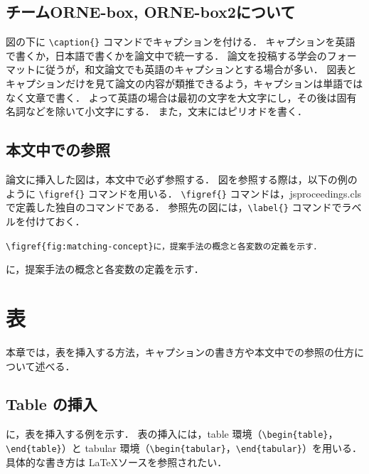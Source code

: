 \documentclass[uplatex, twocolumn, 9pt]{jsproceedings}
\begin{document}
\subsection{チームORNE-box, ORNE-box2について}
図の下に \verb*|\caption{}| コマンドでキャプションを付ける．
キャプションを英語で書くか，日本語で書くかを論文中で統一する．
論文を投稿する学会のフォーマットに従うが，和文論文でも英語のキャプションとする場合が多い．
図表とキャプションだけを見て論文の内容が類推できるよう，キャプションは単語ではなく文章で書く．
よって英語の場合は最初の文字を大文字にし，その後は固有名詞などを除いて小文字にする．
また，文末にはピリオドを書く．

\subsection{本文中での参照}
論文に挿入した図は，本文中で必ず参照する．
図を参照する際は，以下の例のように \verb*|\figref{}| コマンドを用いる．
\verb*|\figref{}| コマンドは，jsproceedings.cls で定義した独自のコマンドである．
参照先の図には，\verb*|\label{}| コマンドでラベルを付けておく．
\begin{description}[style=nextline]
  \item[\LaTeX ソース]%
  \verb|\figref{fig:matching-concept}に，提案手法の概念と各変数の定義を示す．|
  \item[出力]%
  に，提案手法の概念と各変数の定義を示す．
\end{description}


\section{表}
本章では，表を挿入する方法，キャプションの書き方や本文中での参照の仕方について述べる．

\subsection{Table の挿入}
に，表を挿入する例を示す．
表の挿入には，table 環境（\verb*|\begin{table}|，\verb*|\end{table}|）と tabular 環境（\verb*|\begin{tabular}|，\verb*|\end{tabular}|）を用いる．
具体的な書き方は \LaTeX ソースを参照されたい．
\end{document}
